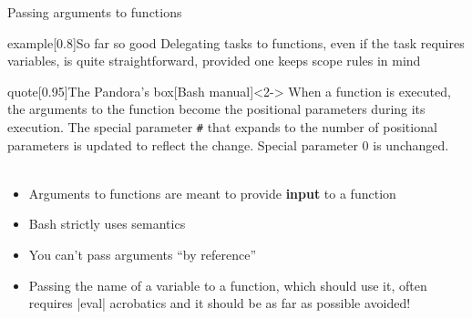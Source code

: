\begin{frame}{Passing arguments to functions}
    \vspace{-3mm}
    \begin{varblock}{example}[0.8\textwidth]{So far so good}
        Delegating tasks to functions, even if the task requires variables, is quite straightforward, provided one keeps scope rules in mind
    \end{varblock}
    \begin{varblock}{quote}[0.95\textwidth]{The Pandora's box}[Bash manual]<2->
        When a function is executed, the arguments to the function become the positional parameters during its execution.
        The special parameter \texttt{\#} that expands to the number of positional parameters is updated to reflect the change.
        Special parameter 0 is unchanged.\\[-1.5ex] ~
    \end{varblock}
    \vspace{-2mm}
    \begin{itemize}[<3->]
        \item Arguments to functions are meant to provide \textbf{input} to a function
        \item Bash strictly uses  semantics
        \item You can't pass arguments ``by reference''\\[-0.5ex] 
        \item \alert{Passing the name of a variable to a function}, which should use it, often requires \bash|eval| acrobatics and it \alert{should be as far as possible avoided!}
    \end{itemize}
\end{frame}
